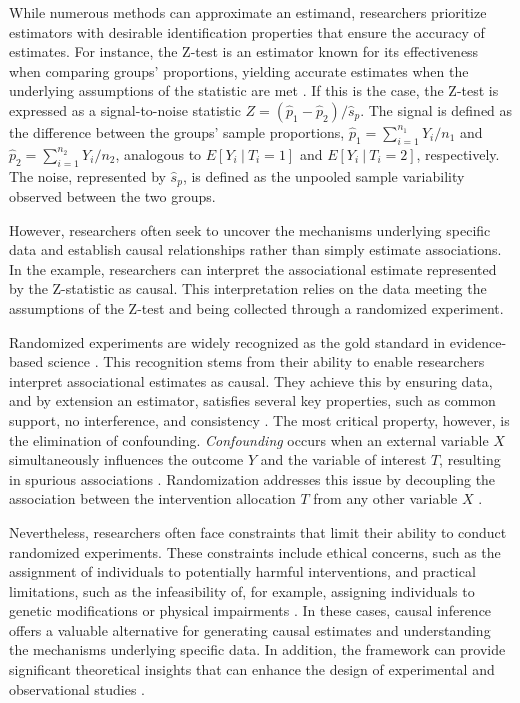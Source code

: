\documentclass[
  authoryear,
  review,
  1p]{elsarticle}
\begin{document}
While numerous methods can approximate an estimand, researchers
prioritize estimators with desirable identification properties that
ensure the accuracy of estimates. For instance, the Z-test is an
estimator known for its effectiveness when comparing groups'
proportions, yielding accurate estimates when the underlying assumptions
of the statistic are met \citep{Kanji_2006}. If this is the case, the
Z-test is expressed as a signal-to-noise statistic
\(Z = (\hat{p}_{1} - \hat{p}_{2})/ \hat{s}_{p}\). The signal is defined
as the difference between the groups' sample proportions,
\(\hat{p}_{1} = \sum_{i=1}^{n_{1}}{Y_{i}/n_{1}}\) and
\(\hat{p}_{2} = \sum_{i=1}^{n_{2}}{Y_{i}/n_{2}}\), analogous to
\(E[Y_{i} \:|\:T_{i}=1]\) and \(E[Y_{i} \:|\:T_{i}=2]\), respectively.
The noise, represented by \(\hat{s}_{p}\), is defined as the unpooled
sample variability observed between the two groups.

However, researchers often seek to uncover the mechanisms underlying
specific data and establish causal relationships rather than simply
estimate associations. In the example, researchers can interpret the
associational estimate represented by the Z-statistic as causal. This
interpretation relies on the data meeting the assumptions of the Z-test
and being collected through a randomized experiment.

Randomized experiments are widely recognized as the gold standard in
evidence-based science \citep{Hariton_et_al_2018, Hansson_2014}. This
recognition stems from their ability to enable researchers interpret
associational estimates as causal. They achieve this by ensuring data,
and by extension an estimator, satisfies several key properties, such as
common support, no interference, and consistency
\citep{Morgan_et_al_2014, Neal_2020}. The most critical property,
however, is the elimination of confounding. \emph{Confounding} occurs
when an external variable \(X\) simultaneously influences the outcome
\(Y\) and the variable of interest \(T\), resulting in spurious
associations \citep{Everitt_et_al_2010}. Randomization addresses this
issue by decoupling the association between the intervention allocation
\(T\) from any other variable \(X\)
\citep{Morgan_et_al_2014, Neal_2020}.

Nevertheless, researchers often face constraints that limit their
ability to conduct randomized experiments. These constraints include
ethical concerns, such as the assignment of individuals to potentially
harmful interventions, and practical limitations, such as the
infeasibility of, for example, assigning individuals to genetic
modifications or physical impairments \citep{Neal_2020}. In these cases,
causal inference offers a valuable alternative for generating causal
estimates and understanding the mechanisms underlying specific data. In
addition, the framework can provide significant theoretical insights
that can enhance the design of experimental and observational studies
\citep{McElreath_2020}.
\end{document}
